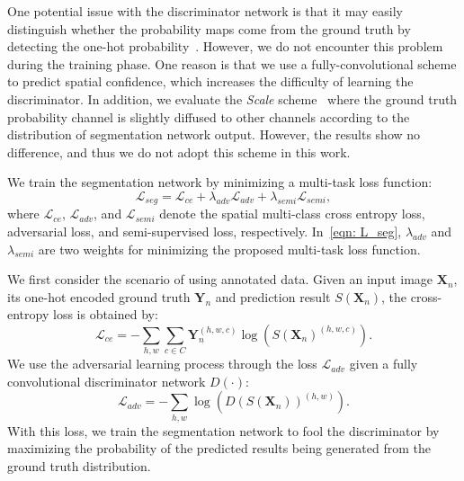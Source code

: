 \documentclass{bmvc2k}
\begin{document}
	One potential issue with the discriminator network is that it may easily distinguish whether the probability maps come from the ground truth by detecting the one-hot probability~\cite{luc2016semantic}. 
	However, we do not encounter this problem during the training phase.
	One reason is that we use a fully-convolutional scheme to predict spatial confidence, which increases the difficulty of learning the discriminator.
	In addition, we evaluate the \textit{Scale} scheme~\cite{luc2016semantic} 
	where the ground truth probability channel is slightly diffused to other channels according to the distribution of segmentation network output. 
	However, the results show no difference, and thus we do not adopt this scheme in this work.
	
	\vspace{-2mm}{\flushleft \bf Segmentation network.}
	We train the segmentation network by minimizing a multi-task loss function:
	\begin{equation}
		\label{eqn: L_seg}
		\mathcal{L}_{seg} = \mathcal{L}_{ce} + \lambda_{adv} \mathcal{L}_{adv} +  \lambda_{semi} \mathcal{L}_{semi},
	\end{equation}
	where $\mathcal{L}_{ce}$, $\mathcal{L}_{adv}$, and $\mathcal{L}_{semi}$ denote the spatial multi-class cross entropy loss, adversarial loss, and semi-supervised loss, respectively.
	In~\eqref{eqn: L_seg}, $\lambda_{adv}$ and $\lambda_{semi}$ are two weights 
	for minimizing the proposed multi-task loss function.
	
	We first consider the scenario of using annotated data. Given an input image $\mathbf{X}_n$, its one-hot encoded ground truth $\mathbf{Y}_n$ and prediction result $S(\mathbf{X}_n)$, the cross-entropy loss is obtained by:
	\begin{equation}
		\mathcal{L}_{ce} = - \sum_{h,w}{} \sum_{c \in C}{} \mathbf{Y}_n^{(h,w,c)} \log(S(\mathbf{X}_n)^{(h,w,c)}).
	\end{equation}
	We use the adversarial learning process through the loss $\mathcal{L}_{adv}$ given a fully convolutional discriminator network $D(\cdot)$:
	\begin{equation}
		\mathcal{L}_{adv} = - \sum_{h,w}{} \log(D(S(\mathbf{X}_n))^{(h,w)}).
	\end{equation}
	With this loss, we train the segmentation network to fool the discriminator by maximizing the probability of the predicted results being generated from the ground truth distribution.
	
\end{document}
